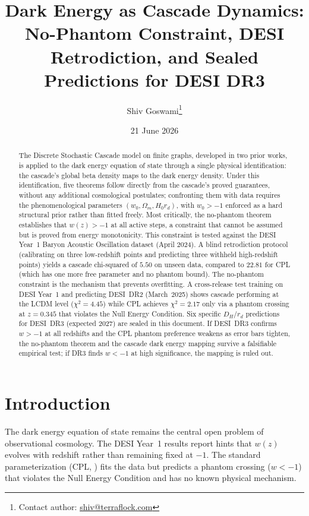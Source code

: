 \documentclass[12pt,a4paper]{article}
\title{%
  \textbf{Dark Energy as Cascade Dynamics:\\
  No-Phantom Constraint, DESI Retrodiction, and Sealed Predictions
  for DESI DR3}
}
\author{Shiv Goswami\thanks{Contact author: \href{mailto:shiv@terraflock.com}{shiv@terraflock.com}}}
\affil{\textls[70]{\textsc{Terraflock Pvt Ltd}}, Bihar, India\\
{\small ORCID\;
  \href{https://orcid.org/0009-0006-1554-9241}{0009-0006-1554-9241}%
  \enspace\textperiodcentered\enspace
  \href{https://shivgoswami.com}{shivgoswami.com}}}
\date{21 June 2026}
\theoremstyle{plain}
\theoremstyle{definition}
\begin{document}
\maketitle

\begin{abstract}
The Discrete Stochastic Cascade model on finite graphs, developed in two prior
works, is applied to the dark energy equation of state through a single physical
identification: the cascade's global beta density maps to the dark energy density.
Under this identification, five theorems follow directly from the cascade's proved
guarantees, without any additional cosmological postulates; confronting them with
data requires the phenomenological parameters $(w_0, \Omega_m, H_0 r_d)$, with
$w_0 > -1$ enforced as a hard structural prior rather than fitted freely. Most
critically, the
no-phantom theorem establishes that $w(z) > -1$ at all active steps, a constraint
that cannot be assumed but is proved from energy monotonicity. This constraint is
tested against the DESI Year~1 Baryon Acoustic Oscillation dataset (April 2024).
A blind retrodiction protocol (calibrating on three low-redshift points and
predicting three withheld high-redshift points) yields a cascade chi-squared of
$5.50$ on unseen data, compared to $22.81$ for CPL (which has one more free
parameter and no phantom bound). The no-phantom constraint is the mechanism that prevents overfitting.
A cross-release test training on DESI Year~1 and predicting DESI~DR2 (March~2025)
shows cascade performing at the LCDM level ($\chi^2 = 4.45$) while CPL achieves
$\chi^2 = 2.17$ only via a phantom crossing at $z = 0.345$ that violates the Null
Energy Condition. Six specific $D_H/r_d$ predictions for DESI~DR3 (expected 2027)
are sealed in this document. If DESI~DR3 confirms $w > -1$ at all redshifts and
the CPL phantom preference weakens as error bars tighten, the no-phantom theorem
and the cascade dark energy mapping survive a falsifiable empirical test; if DR3
finds $w < -1$ at high significance, the mapping is ruled out.
\end{abstract}

\tableofcontents
\newpage

\section{Introduction}

The dark energy equation of state remains the central open problem of observational
cosmology. The DESI Year~1 results \cite{desi2024} report hints that $w(z)$ evolves
with redshift rather than remaining fixed at $-1$. The standard parameterization
(CPL, \cite{chevallier2001,linder2003}) fits the data but predicts a phantom crossing
($w < -1$) that violates the Null Energy Condition and has no known physical
mechanism.
\end{document}

